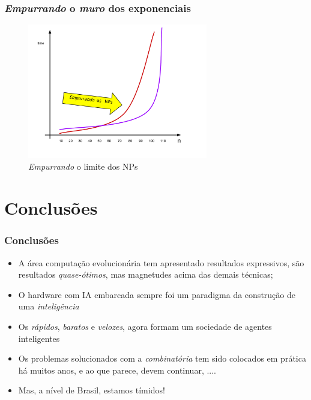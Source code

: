 \documentclass{beamer}
\begin{document}


\begin{frame}[fragile]
\frametitle{\textit{Empurrando} o \textit{muro} dos exponenciais}

\begin{figure}[!hb]
\begin{center}
\includegraphics[width=0.7\textwidth , height=0.7\textheight]{Execution-Time-NP-03.pdf}
\caption{{\em Empurrando} o limite dos NPs}
\label{fig_Execution-Time-NP-03}
\end{center}
\end{figure}


\end{frame}



\section{Conclusões}

\begin{frame}[fragile]%
\frametitle{Conclusões}
\begin{block}

  \begin{itemize}
  \item A área computação evolucionária tem apresentado resultados expressivos,   são resultados \textit{quase-ótimos}, mas magnetudes acima das demais técnicas;
  \pause
    
  \item O hardware com IA embarcada sempre foi um paradigma da construção   de uma \textit{inteligência}
    \pause
    
  \item Os \textit{rápidos}, \textit{baratos} e \textit{velozes}, agora formam   um sociedade de agentes inteligentes
    \pause
    
  \item Os problemas solucionados com a \textit{combinatória} tem sido colocados em prática   há muitos anos, e ao que parece, devem continuar, ....
    \pause
  
  \item Mas, a nível de Brasil, estamos tímidos!
  
  \end{itemize}
  \end{block}

\end{frame}
\end{document}

